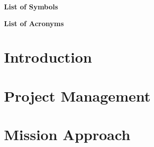\documentclass[11pt]{report}
\begin{document}
%
%



%
%



%
%

\newpage
{}
\tableofcontents
\newpage
{}
\listoffigures
\newpage
{}
\listoftables

%
%

\newpage
{}
\Large{\textbf{List of Symbols}}
\small


%
%

\newpage
{}
\Large{\textbf{List of Acronyms}}
\small


%
%



%
%

\chapter{Introduction}
\label{chap:intro}


%
%

\chapter{Project Management}
\label{chap:project_management}



%
%

\chapter{Mission Approach}
\label{chap:mission_approach}






\end{document}
